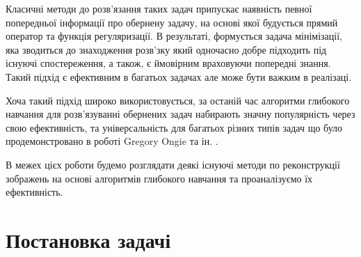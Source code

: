 \documentclass[14pt,a4paper]{extarticle}
\newcounter{e}
\numberwithin{equation}{section}
\numberwithin{figure}{section}
\begin{document}
	Класичні методи до розв'язання таких задач припускає наявність певної попередньої інформації про обернену задачу, на основі якої будується прямий оператор та функція регуляризації. В результаті, формується задача мінімізації, яка зводиться до знаходження розв'зку який одночасно добре підходить під існуючі спостереження, а також, є ймовірним враховуючи попередні знання. Такий підхід є ефективним в багатьох задачах але може бути важким в реалізаці. 
				
	Хоча такий підхід широко використовується, за останій час алгоритми глибокого навчання для розв'язуванні обернених задач набирають значну популярність через свою ефективність, та універсальність для багатьох різних типів задач що було продемонстровано в роботі Gregory Ongie та ін. \cite{ongie2020deep}. 
	
	В межех цієх роботи будемо розглядати деякі існуючі методи по реконструкції зображень на основі алгоритмів глибокого навчання та проаналізуємо їх ефективність.
	
	
	\newpage
	\thispagestyle{empty}
	\section{Постановка задачі} 
	
	

	
	
	
\end{document}
